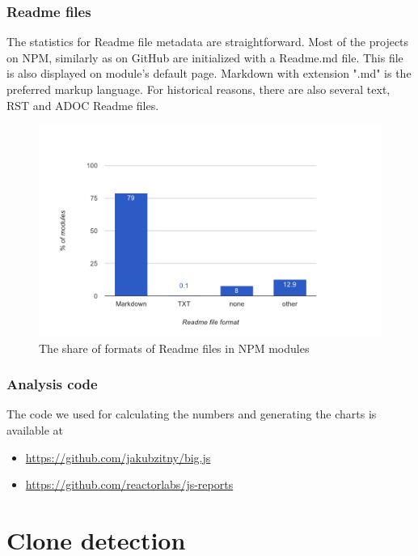\documentclass[thesis=M,english]{FITthesis}[2012/10/20]
\begin{document}
\subsection{Readme files}

The statistics for Readme file metadata are straightforward. Most of the projects on NPM, similarly as on GitHub are initialized with a Readme.md file. This file is also displayed on module's default page. Markdown with extension ".md" is the preferred markup language. For historical reasons, there are also several text, RST and ADOC Readme files.

\begin{center}
\begin{figure}[h!]
	\hspace*{-1cm}\includegraphics[totalheight=265pt]{images/npm_readmes.png}
	\caption{The share of formats of Readme files in NPM modules}
	\label{fig: npm_readmes}
\end{figure}
\end{center}

\subsection{Analysis code}

The code we used for calculating the numbers and generating the charts is available at

\begin{itemize}
\item \url{https://github.com/jakubzitny/big.js}
\item \url{https://github.com/reactorlabs/js-reports}
\end{itemize}

\chapter{Clone detection}
\end{document}
